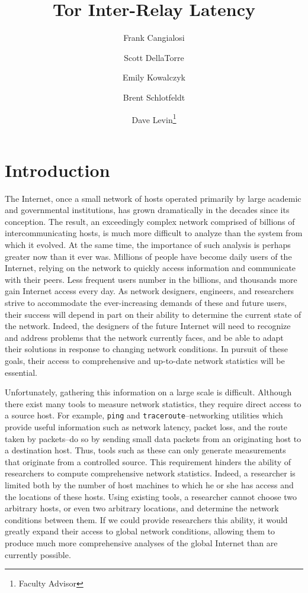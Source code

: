 \documentclass[twocolumn,11pt]{article}
\title{Tor Inter-Relay Latency}
\author[1]{Frank Cangialosi}
\author[1]{Scott DellaTorre}
\author[1]{Emily Kowalczyk}
\author[1]{Brent Schlotfeldt}
\author[1]{Dave Levin\thanks{Faculty Advisor}}
\affil[1]{University of Maryland}
\date{}
\begin{document}
\maketitle

\section {Introduction}

The Internet, once a small network of hosts operated primarily by large academic and governmental institutions, has grown dramatically in the decades since its conception. The result, an exceedingly complex network comprised of billions of intercommunicating hosts, is much more difficult to analyze than the system from which it evolved. At the same time, the importance of such analysis is perhaps greater now than it ever was. Millions of people have become daily users of the Internet, relying on the network to quickly access information and communicate with their peers. Less frequent users number in the billions, and thousands more gain Internet access every day. As network designers, engineers, and researchers strive to accommodate the ever-increasing demands of these and future users, their success will depend in part on their ability to determine the current state of the network. Indeed, the designers of the future Internet will need to recognize and address problems that the network currently faces, and be able to adapt their solutions in response to changing network conditions. In pursuit of these goals, their access to comprehensive and up-to-date network statistics will be essential.

Unfortunately, gathering this information on a large scale is difficult. Although there exist many tools to measure network statistics, they require direct access to a source host. For example, \texttt{ping} and \texttt{traceroute}--networking utilities which provide useful information such as network latency, packet loss, and the route taken by packets--do so by sending small data packets from an originating host to a destination host. Thus, tools such as these can only generate measurements that originate from a controlled source. This requirement hinders the ability of  researchers to compute comprehensive network statistics. Indeed, a researcher is limited both by the number of host machines to which he or she has access and the locations of these hosts. Using existing tools, a researcher cannot choose two arbitrary hosts, or even two arbitrary locations, and determine the network conditions between them. If we could provide researchers this ability, it would greatly expand their access to global network conditions, allowing them to produce much more comprehensive analyses of the global Internet than are currently possible.
\end{document}
